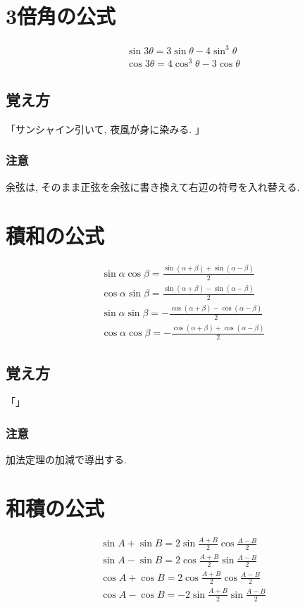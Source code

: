 \documentclass[]{jreport}
\begin{document}
\section{3倍角の公式}
\begin{equation}
    \begin{array}{l}
        \sin3\theta=3\sin\theta-4\sin^3\theta\\
        \cos3\theta=4\cos^3\theta-3\cos\theta
    \end{array}
\end{equation}
\subsection{覚え方}
「サンシャイン引いて, 夜風が身に染みる. 」
\subsubsection{注意}
余弦は, そのまま正弦を余弦に書き換えて右辺の符号を入れ替える.

\section{積和の公式}
\begin{equation}
    \begin{array}{l}
        \sin\alpha\cos\beta=\frac{\sin(\alpha+\beta)+\sin(\alpha-\beta)}{2}\\
        \cos\alpha\sin\beta=\frac{\sin(\alpha+\beta)-\sin(\alpha-\beta)}{2}\\
        \sin\alpha\sin\beta=-\frac{\cos(\alpha+\beta)-\cos(\alpha-\beta)}{2}\\
        \cos\alpha\cos\beta=-\frac{\cos(\alpha+\beta)+\cos(\alpha-\beta)}{2}
    \end{array}
\end{equation}
\subsection{覚え方}
「」
\subsubsection{注意}
加法定理の加減で導出する.

\section{和積の公式}
\begin{equation}
    \begin{array}{l}
        \sin A+\sin B=2\sin\frac{A+B}{2}\cos\frac{A-B}{2}\\
        \sin A-\sin B=2\cos\frac{A+B}{2}\sin\frac{A-B}{2}\\
        \cos A+\cos B=2\cos\frac{A+B}{2}\cos\frac{A-B}{2}\\
        \cos A-\cos B=-2\sin\frac{A+B}{2}\sin\frac{A-B}{2}
    \end{array}
\end{equation}
\end{document}
